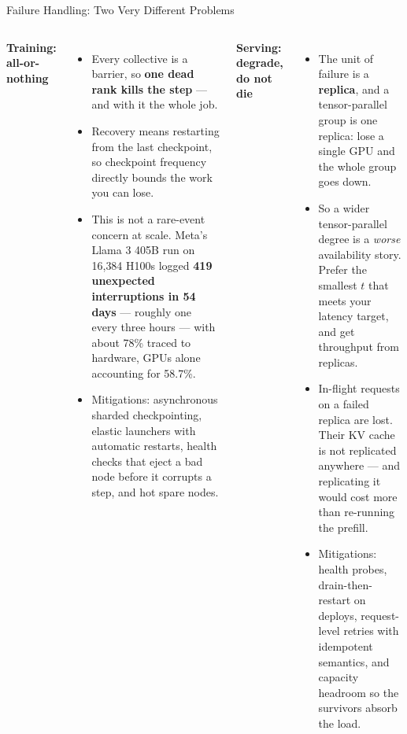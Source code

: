 \begin{frame}{Failure Handling: Two Very Different Problems}
  \begin{columns}[T,onlytextwidth]
      \textbf{Training: all-or-nothing}
      \begin{itemize}\scriptsize\itemsep0.05em
        \item[\textcolor{red}{$\blacktriangleright$}] Every collective is a barrier, so \textbf{one dead rank kills the step} --- and with it the whole job.
        \item[\textcolor{red}{$\blacktriangleright$}] Recovery means restarting from the last checkpoint, so checkpoint frequency directly bounds the work you can lose.
        \item[\textcolor{red}{$\blacktriangleright$}] This is not a rare-event concern at scale. Meta's Llama 3 405B run on 16{,}384 H100s logged \textbf{419 unexpected interruptions in 54 days} --- roughly one every three hours --- with about 78\% traced to hardware, GPUs alone accounting for 58.7\%.
        \item[\textcolor{red}{$\blacktriangleright$}] Mitigations: asynchronous sharded checkpointing, elastic launchers with automatic restarts, health checks that eject a bad node before it corrupts a step, and hot spare nodes.
      \end{itemize}
      \textbf{Serving: degrade, do not die}
      \begin{itemize}\scriptsize\itemsep0.05em
        \item[\textcolor{red}{$\blacktriangleright$}] The unit of failure is a \textbf{replica}, and a tensor-parallel group is one replica: lose a single GPU and the whole group goes down.
        \item[\textcolor{red}{$\blacktriangleright$}] So a wider tensor-parallel degree is a \emph{worse} availability story. Prefer the smallest $t$ that meets your latency target, and get throughput from replicas.
        \item[\textcolor{red}{$\blacktriangleright$}] In-flight requests on a failed replica are lost. Their KV cache is not replicated anywhere --- and replicating it would cost more than re-running the prefill.
        \item[\textcolor{red}{$\blacktriangleright$}] Mitigations: health probes, drain-then-restart on deploys, request-level retries with idempotent semantics, and capacity headroom so the survivors absorb the load.
      \end{itemize}

\end{columns}
\end{frame}
